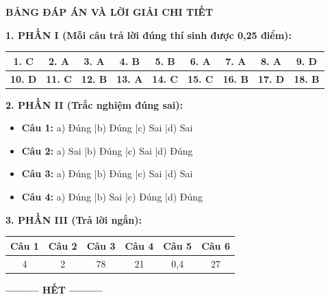 \documentclass[12pt,a4paper]{article}
\begin{document}
\newpage
\begin{center}
	{\color{hfRed}\textbf{\Large BẢNG ĐÁP ÁN VÀ LỜI GIẢI CHI TIẾT}}
\end{center}
\vspace{0.3cm}

\noindent
\textbf{1. PHẦN I (Mỗi câu trả lời đúng thí sinh được 0,25 điểm):}
\begin{center}
\begin{tabular}{|c|c|c|c|c|c|c|c|c|}
\hline
\textbf{1. C} & \textbf{2. A} & \textbf{3. A} & \textbf{4. B} & \textbf{5. B} & \textbf{6. A} & \textbf{7. A} & \textbf{8. A} & \textbf{9. D} \\ \hline
\textbf{10. D} & \textbf{11. C} & \textbf{12. B} & \textbf{13. A} & \textbf{14. C} & \textbf{15. C} & \textbf{16. B} & \textbf{17. D} & \textbf{18. B} \\ \hline
\end{tabular}
\end{center}

\noindent
\textbf{2. PHẦN II (Trắc nghiệm đúng sai):}
\begin{itemize}
	\item \textbf{Câu 1:} a) Đúng \quad|\quad b) Đúng \quad|\quad c) Sai \quad|\quad d) Sai
	\item \textbf{Câu 2:} a) Sai \quad|\quad b) Đúng \quad|\quad c) Sai \quad|\quad d) Đúng
	\item \textbf{Câu 3:} a) Đúng \quad|\quad b) Đúng \quad|\quad c) Sai \quad|\quad d) Sai
	\item \textbf{Câu 4:} a) Đúng \quad|\quad b) Sai \quad|\quad c) Đúng \quad|\quad d) Đúng
\end{itemize}

\noindent
\textbf{3. PHẦN III (Trả lời ngắn):}
\begin{center}
\begin{tabular}{|c|c|c|c|c|c|}
\hline
\textbf{Câu 1} & \textbf{Câu 2} & \textbf{Câu 3} & \textbf{Câu 4} & \textbf{Câu 5} & \textbf{Câu 6} \\ \hline
4 & 2 & 78 & 21 & 0,4 & 27 \\ \hline
\end{tabular}
\end{center}

\begin{center}
\textbf{--------- HẾT ---------}
\end{center}
\end{document}
